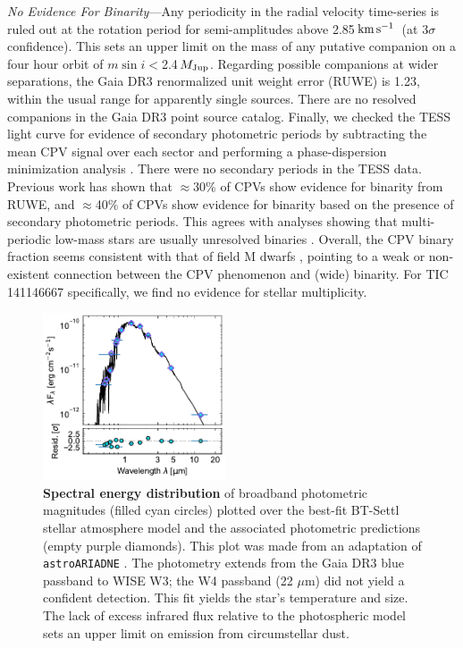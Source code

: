 \documentclass[11pt,twocolumn,tighten]{aastex7}
\newcommand{\kms}{\ensuremath{\rm km\,s^{-1}}}
\begin{document}
{\it No Evidence For Binarity}---Any periodicity in the radial
velocity time-series is ruled out at the rotation period for
semi-amplitudes above 2.85\,\kms\ (at 3$\sigma$ confidence).  This
sets an upper limit on the mass of any putative companion on a four
hour orbit of $m \sin i $$<$2.4\,$M_{\rm Jup}$.  Regarding possible
companions at wider separations, the Gaia DR3 renormalized unit weight
error (RUWE) is 1.23, within the usual
range for apparently single sources.  There are no resolved companions
in the Gaia DR3 point source catalog.  Finally, we checked the TESS
light curve for evidence of secondary photometric periods by
subtracting the mean CPV signal over each sector and performing a
phase-dispersion minimization analysis
\citep{Stellingwerf1978,2021zndo...1011188B}.  There were no secondary
periods in the TESS data.  Previous work \citep{Bouma2024} has shown
that $\approx$30\% of CPVs show evidence for binarity from RUWE, and
$\approx$40\% of CPVs show evidence for binarity based on the presence
of secondary photometric periods.  This agrees with analyses showing
that multi-periodic low-mass stars are usually unresolved binaries
\citep{Tokovinin2018}.  Overall, the CPV binary fraction seems
consistent with that of field M dwarfs \citep{Winters2019}, pointing
to a weak or non-existent connection between the CPV phenomenon and
(wide) binarity.  For TIC\,141146667 specifically, we find no
evidence for stellar multiplicity.


\begin{figure}[!t]
  \centering
  \includegraphics[width=0.48\textwidth]{f4.pdf}
  \caption{
    {\bf Spectral energy distribution} of broadband photometric
    magnitudes (filled cyan circles) plotted over the best-fit
    BT-Settl stellar atmosphere model \citep{Allard2012} and the
    associated photometric predictions (empty purple
    diamonds).  This plot was made from an adaptation of
    \texttt{astroARIADNE} \citep{Vines2022}.  The photometry extends
    from the Gaia DR3 blue passband to WISE W3; the W4 passband (22
    $\mu$m) did not yield a confident detection.  This fit yields the
    star's temperature and size.  The lack of excess infrared flux
    relative to the photospheric model sets an upper limit on emission
    from circumstellar dust.
    }
  \label{fig:sed}
\end{figure}
\end{document}
